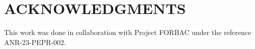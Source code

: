 \documentclass[lettersize,journal]{IEEEtran}
\begin{document}
\section*{ACKNOWLEDGMENTS}
This work was done in collaboration with Project FORBAC under the reference ANR-23-PEPR-002.



\end{document}
